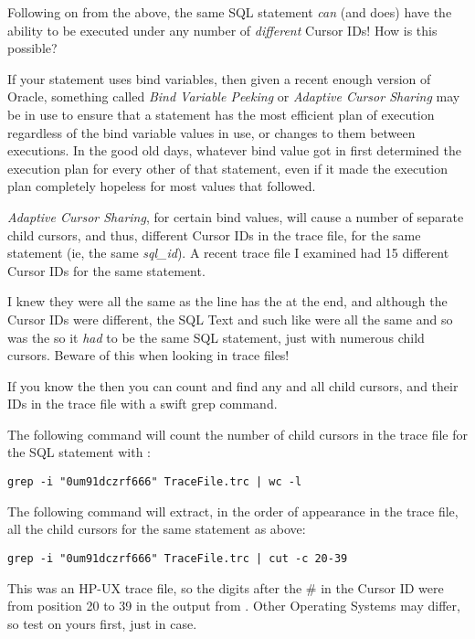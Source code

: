Following on from the above, the same SQL statement \emph{can} (and does) have the ability to be executed under any number of \emph{different} Cursor IDs! How is this possible?

If your statement uses bind variables, then given a recent enough version of Oracle, something called \emph{Bind Variable Peeking} or \emph{Adaptive Cursor Sharing} may be in use to ensure that a statement has the most efficient plan of execution regardless of the bind variable values in use, or changes to them between executions. In the good old days, whatever bind value got in first determined the execution plan for every other  of that statement, even if it made the execution plan completely hopeless for most values that followed.

\emph{Adaptive Cursor Sharing}, for certain bind values, will cause a number of separate child cursors, and thus, different Cursor IDs in the trace file, for the same statement (ie, the same \emph{sql\_id}). A recent trace file I examined had 15 different Cursor IDs for the same statement. 

I knew they were all the same as the  line has the  at the end, and although the Cursor IDs were different, the SQL Text and such like were all the same and so was the  so it \emph{had} to be the same SQL statement, just with numerous child cursors. Beware of this when looking in trace files!

If you know the  then you can count and find any and all child cursors, and their IDs in the trace file with a swift grep command.

The following command will count the number of child cursors in the trace file for the SQL statement with :

\begin{lstlisting}[numbers=none,caption={Counting Child Cursors in a Trace File}]
grep -i "0um91dczrf666" TraceFile.trc | wc -l
\end{lstlisting}

The following command will extract, in the order of appearance in the trace file, all the child cursors for the same statement as above:

\begin{lstlisting}[numbers=none,caption={Extracting Child Cursors from a Trace File}]
grep -i "0um91dczrf666" TraceFile.trc | cut -c 20-39
\end{lstlisting}

This was an HP-UX trace file, so the digits after the \# in the Cursor ID were from position 20 to 39 in the output from . Other Operating Systems may differ, so test on yours first, just in case.

